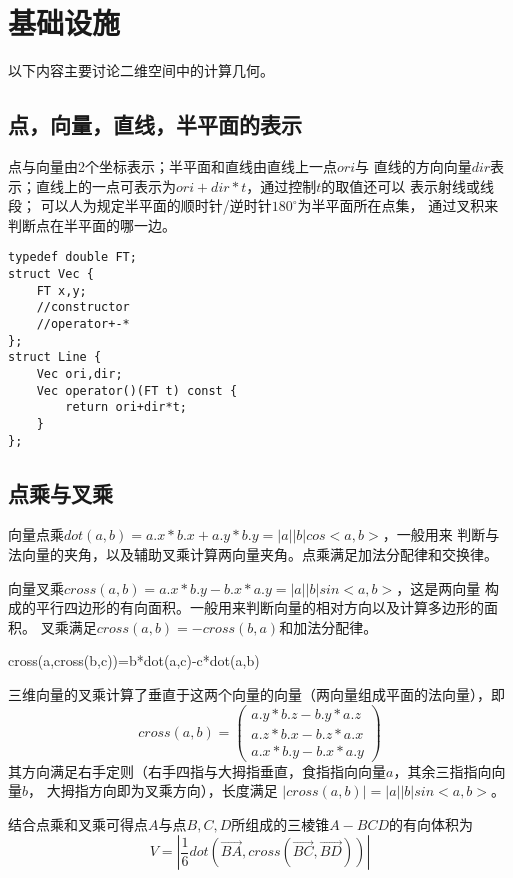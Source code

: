 \section{基础设施}
以下内容主要讨论二维空间中的计算几何。
\subsection{点，向量，直线，半平面的表示}
点与向量由2个坐标表示；半平面和直线由直线上一点$ori$与
直线的方向向量$dir$表示；直线上的一点可表示为$ori+dir*t$，通过控制$t$的取值还可以
表示射线或线段；
可以人为规定半平面的顺时针/逆时针$180^\circ$为半平面所在点集，
通过叉积来判断点在半平面的哪一边。
\begin{lstlisting}
typedef double FT;
struct Vec {
    FT x,y;
    //constructor
    //operator+-*
};
struct Line {
    Vec ori,dir;
    Vec operator()(FT t) const {
        return ori+dir*t;
    }
};
\end{lstlisting}
\subsection{点乘与叉乘}
向量点乘$dot(a,b)=a.x*b.x+a.y*b.y=|a||b|cos<a,b>$，一般用来
判断与法向量的夹角，以及辅助叉乘计算两向量夹角。点乘满足加法分配律和交换律。

向量叉乘$cross(a,b)=a.x*b.y-b.x*a.y=|a||b|sin<a,b>$，这是两向量
构成的平行四边形的有向面积。一般用来判断向量的相对方向以及计算多边形的面积。
叉乘满足$cross(a,b)=-cross(b,a)$和加法分配律。

\begin{theorem}[拉格朗日公式]
	cross(a,cross(b,c))=b*dot(a,c)-c*dot(a,b)
\end{theorem}

三维向量的叉乘计算了垂直于这两个向量的向量（两向量组成平面的法向量），即
\begin{displaymath}
	cross(a,b)=\left(\begin{array}{c}
		a.y*b.z-b.y*a.z \\
		a.z*b.x-b.z*a.x \\
		a.x*b.y-b.x*a.y
	\end{array}\right)
\end{displaymath}
其方向满足右手定则（右手四指与大拇指垂直，食指指向向量$a$，其余三指指向向量$b$，
大拇指方向即为叉乘方向），长度满足
$|cross(a,b)|=|a||b|sin<a,b>$。

结合点乘和叉乘可得点$A$与点$B,C,D$所组成的三棱锥$A-BCD$的有向体积为
\begin{displaymath}
	V=|\frac{1}{6}dot(\overrightarrow{BA},cross(\overrightarrow{BC},
	\overrightarrow{BD}))|
\end{displaymath}
